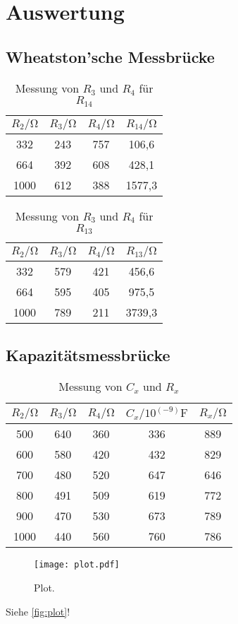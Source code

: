 \section{Auswertung}
\label{sec:Auswertung}

\subsection{Wheatston'sche Messbrücke}

\begin{table}
  \centering
  \caption{Messung von $R_3$ und $R_4$ für $R_{14}$}
  \label{tab:R14}
  \begin{tabular}{c c c c}
    \toprule
    $R_2/\unit{\ohm}$ & $R_3/\unit{\ohm}$ & $R_4/\unit{\ohm}$ & $R_{14}/\unit{\ohm}$ \\
    \midrule
     332 & 243 & 757 &  106,6 \\
     664 & 392 & 608 &  428,1 \\
    1000 & 612 & 388 & 1577,3 \\
    \bottomrule
  \end{tabular}
\end{table}

\begin{table}
  \centering
  \caption{Messung von $R_3$ und $R_4$ für $R_{13}$}
  \label{tab:R13}
  \begin{tabular}{c c c c}
    \toprule
    $R_2/\unit{\ohm}$ & $R_3/\unit{\ohm}$ & $R_4/\unit{\ohm}$ & $R_{13}/\unit{\ohm}$ \\
    \midrule
     332 & 579 & 421 &  456,6 \\
     664 & 595 & 405 &  975,5 \\
    1000 & 789 & 211 & 3739,3 \\
    \bottomrule
  \end{tabular}
\end{table}

\subsection{Kapazitätsmessbrücke}
\begin{table}
  \centering
  \caption{Messung von $C_x$ und $R_x$}
  \label{tab:Cx,Rx}
  \begin{tabular}{c c c c c}
    \toprule
    $R_2/\unit{\ohm}$ & $R_3/\unit{\ohm}$ & $R_4/\unit{\ohm}$ & $C_x/10^(-9)\unit{\farad}$ & $R_x/\unit{\ohm}$ \\
    \midrule
     500 & 640 & 360 & 336 & 889 \\
     600 & 580 & 420 & 432 & 829 \\
     700 & 480 & 520 & 647 & 646 \\
     800 & 491 & 509 & 619 & 772 \\
     900 & 470 & 530 & 673 & 789 \\
    1000 & 440 & 560 & 760 & 786 \\
    \bottomrule
  \end{tabular}
\end{table}


\begin{figure}
  \centering
  \texttt{[image: plot.pdf]}
  \caption{Plot.}
  \label{fig:plot}
\end{figure}


Siehe \autoref{fig:plot}!
